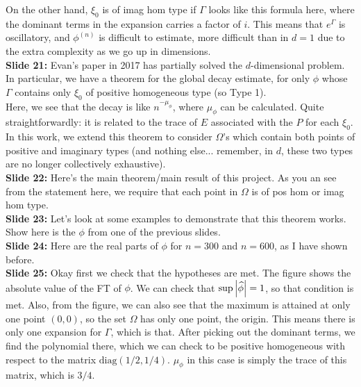 \documentclass[11pt]{article}
\begin{document}
On the other hand, $\xi_0$ is of imag hom type if $\Gamma$ looks like this formula here, where the dominant terms in the expansion carries a factor of $i$. This means that $e^\Gamma$ is oscillatory, and $\phi^{(n)}$ is difficult to estimate, more difficult than in $d=1$ due to the extra complexity as we go up in dimensions.\\








\noindent \textbf{Slide 21:} Evan's paper in 2017 has partially solved the $d$-dimensional problem. In particular, we have a theorem for the global decay estimate, for only $\phi$ whose $\Gamma$ contains only $\xi_0$ of positive homogeneous type (so Type 1). \\

Here, we see that the decay is like $n^{-\mu_\phi}$, where $\mu_\phi$ can be calculated. Quite straightforwardly: it is related to the trace of $E$ associated with the $P$ for each $\xi_0$. \\

In this work, we extend this theorem to consider $\Omega$'s which contain both points of positive and imaginary types (and nothing else... remember, in $d$, these two types are no longer collectively exhaustive). \\
 

\noindent \textbf{Slide 22:} Here's the main theorem/main result of this project. As you an see from the statement here, we require that each point in $\Omega$ is of pos hom or imag hom type. \\

\noindent \textbf{Slide 23:} Let's look at some examples to demonstrate that this theorem works. Show here is the $\phi$ from one of the previous slides. \\

\noindent \textbf{Slide 24:} Here are the real parts of $\phi$ for $n=300$ and $n=600$, as I have shown before. \\

\noindent \textbf{Slide 25:} Okay first we check that the hypotheses are met. The figure shows the absolute value of the FT of $\phi$. We can check that $\sup\abs{\widehat{\phi}} = 1$, so that condition is met. Also, from the figure, we can also see that the maximum is attained at only one point $(0,0)$, so the set $\Omega$ has only one point, the origin. This means there is only one expansion for $\Gamma$, which is that. After picking out the dominant terms, we find the polynomial there, which we can check to be positive homogeneous with respect to the matrix $\text{diag}(1/2, 1/4)$. $\mu_\phi$ in this case is simply the trace of this matrix, which is $3/4$.   \\
\end{document}

